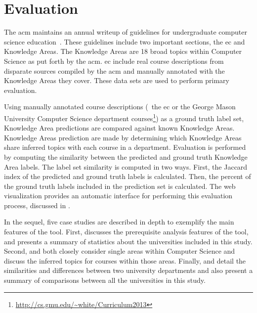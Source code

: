 \section{Evaluation}
\label{sec:evaluation}


The \ac{acm} maintains an annual writeup of guidelines for undergraduate computer science education~\cite{CS2013}.
These guidelines include two important sections, the \acf{ec} and Knowledge Areas.
The Knowledge Areas are 18 broad topics within Computer Science as put forth by the \ac{acm}.
\ac{ec} include real course descriptions from disparate sources compiled by the \ac{acm} and manually annotated with the Knowledge Areas they cover.
These data sets are used to perform primary evaluation.


Using manually annotated course descriptions (\eg\ the \ac{ec} or the George Mason University Computer Science department courses\footnote{\url{http://cs.gmu.edu/~white/Curriculum2013}}) as a ground truth label set, Knowledge Area predictions are compared against known Knowledge Areas.
Knowledge Areas prediction are made by determining which Knowledge Areas share inferred topics with each course in a department.
Evaluation is performed by computing the similarity between the predicted and ground truth Knowledge Area labels.
The label set similarity is computed in two ways.
First, the Jaccard index of the predicted and ground truth labels is calculated.
Then, the percent of the ground truth labels included in the prediction set is calculated.
The web visualization provides an automatic interface for performing this evaluation process, discussed in .


In the sequel, five case studies are described in depth to exemplify the main features of the tool.
First,  discusses the prerequisite analysis features of the tool, and presents a summary of statistics about the universities included in this study.
Second,  and  both closely consider single areas within Computer Science and discuss the inferred topics for courses within those areas.
Finally,  and  detail the similarities and differences between two university departments and also present a summary of comparisons between all the universities in this study.

